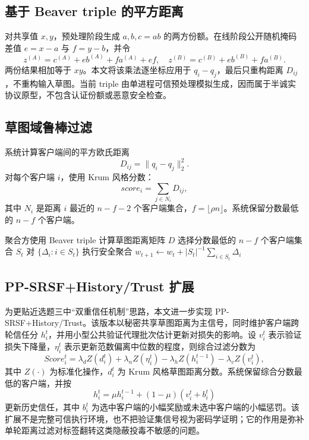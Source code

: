 \documentclass[final]{jcr}
\begin{document}
\subsection{基于 Beaver triple 的平方距离}
对共享值 $x,y$，预处理阶段生成 $a,b,c=ab$ 的两方份额。在线阶段公开随机掩码差值 $e=x-a$ 与 $f=y-b$，并令
\[
z^{(A)}=c^{(A)}+eb^{(A)}+fa^{(A)}+ef,\quad
z^{(B)}=c^{(B)}+eb^{(B)}+fa^{(B)}.
\]
两份结果相加等于 $xy$。本文将该乘法逐坐标应用于 $q_i-q_j$，最后只重构距离 $D_{ij}$，不重构输入草图。当前 triple 由单进程可信预处理模拟生成，因而属于半诚实协议原型，不包含认证份额或恶意安全检查。

\subsection{草图域鲁棒过滤}
系统计算客户端间的平方欧氏距离
\[
D_{ij}=\|q_i-q_j\|_2^2.
\]
对每个客户端 $i$，使用 Krum 风格分数：
\[
score_i=\sum_{j\in N_i}D_{ij},
\]
其中 $N_i$ 是距离 $i$ 最近的 $n-f-2$ 个客户端集合，$f=\lfloor \rho n \rfloor$。系统保留分数最低的 $n-f$ 个客户端。

\renewcommand{\algorithmcfname}{算法}
\SetAlgoCaptionSeparator{~}
\begin{algorithm}[H]
  \caption{\kaishu {} PP-SRSF 鲁棒安全聚合流程}
  \label{alg:ppsrsf}
  \LinesNumbered
  聚合方使用 Beaver triple 计算草图距离矩阵 $D$\;
选择分数最低的 $n-f$ 个客户端集合 $S_t$\;
  对 $\{\Delta_i:i\in S_t\}$ 执行安全聚合\;
  $w_{t+1}\leftarrow w_t + |S_t|^{-1}\sum_{i\in S_t}\Delta_i$\;
\end{algorithm}

\subsection{PP-SRSF+History/Trust 扩展}
为更贴近选题三中“双重信任机制”思路，本文进一步实现 PP-SRSF+History/Trust。该版本以秘密共享草图距离为主信号，同时维护客户端跨轮信任分 $h_i^t$，并用小型公共验证代理批次估计更新对损失的影响。设 $v_i^t$ 表示验证损失下降量，$\eta_i^t$ 表示更新范数偏离中位数的程度，则综合过滤分数为
\[
Score_i^t = \lambda_d Z(d_i^t)+\lambda_n Z(\eta_i^t)-\lambda_h Z(h_i^{t-1})-\lambda_v Z(v_i^t),
\]
其中 $Z(\cdot)$ 为标准化操作，$d_i^t$ 为 Krum 风格草图距离分数。系统保留综合分数最低的客户端，并按
\[
h_i^t=\mu h_i^{t-1}+(1-\mu)(v_i^t+b_i^t)
\]
更新历史信任，其中 $b_i^t$ 为选中客户端的小幅奖励或未选中客户端的小幅惩罚。该扩展不是完整可信执行环境，也不把验证集信号视为密码学证明；它的作用是弥补单轮距离过滤对标签翻转这类隐蔽投毒不敏感的问题。
\end{document}
